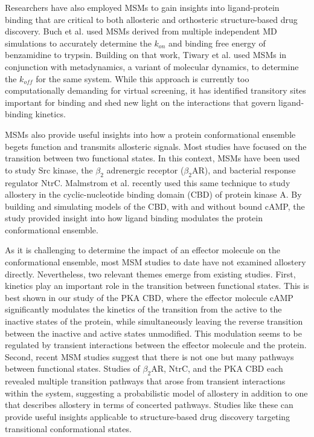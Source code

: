 \par Researchers have also employed MSMs to gain insights into ligand-protein binding that are critical to both allosteric and orthosteric structure-based drug discovery. Buch et al. used MSMs derived from multiple independent MD simulations to accurately determine the $k_{on}$ and binding free energy of benzamidine to trypsin.\cite{Buch2011} Building on that work, Tiwary et al. used MSMs in conjunction with metadynamics, a variant of molecular dynamics, to determine the $k_{off}$ for the same system.\cite{Tiwary2015} While this approach is currently too computationally demanding for virtual screening, it has identified transitory sites important for binding and shed new light on the interactions that govern ligand-binding kinetics.


\par MSMs also provide useful insights into how a protein conformational ensemble begets function and transmits allosteric signals. Most studies have focused on the transition between two functional states. In this context, MSMs have been used to study Src kinase,\cite{Shukla2014b} the \(\beta_2\) adrenergic receptor (\(\beta_2\)AR),\cite{Kohlhoff2014} and bacterial response regulator NtrC.\cite{Pontiggia2015,Vanatta2015} Malmstrom et al. recently used this same technique to study allostery in the cyclic-nucleotide binding domain (CBD) of protein kinase A.\cite{Malmstrom2015} By building and simulating models of the CBD, with and without bound cAMP, the study provided insight into how ligand binding modulates the protein conformational ensemble.


\par As it is challenging to determine the impact of an effector molecule on the conformational ensemble, most MSM studies to date have not examined allostery directly. Nevertheless, two relevant themes emerge from existing studies. First, kinetics play an important role in the transition between functional states.\cite{Malmstrom2015,Pontiggia2015,Vanatta2015} This is best shown in our study of the PKA CBD, where the effector molecule cAMP significantly modulates the kinetics of the transition from the active to the inactive states of the protein, while simultaneously leaving the reverse transition between the inactive and active states unmodified.\cite{Malmstrom2015} This modulation seems to be regulated by transient interactions between the effector molecule and the protein. Second, recent MSM studies suggest that there is not one but many pathways between functional states. Studies of \(\beta_2\)AR,\cite{Kohlhoff2014} NtrC,\cite{Vanatta2015,Pontiggia2015} and the PKA CBD\cite{Malmstrom2015} each revealed multiple transition pathways that arose from transient interactions within the system, suggesting a probabilistic model of allostery in addition to one that describes allostery in terms of concerted pathways.\cite{Vanatta2015} Studies like these can provide useful insights applicable to structure-based drug discovery targeting transitional conformational states.



